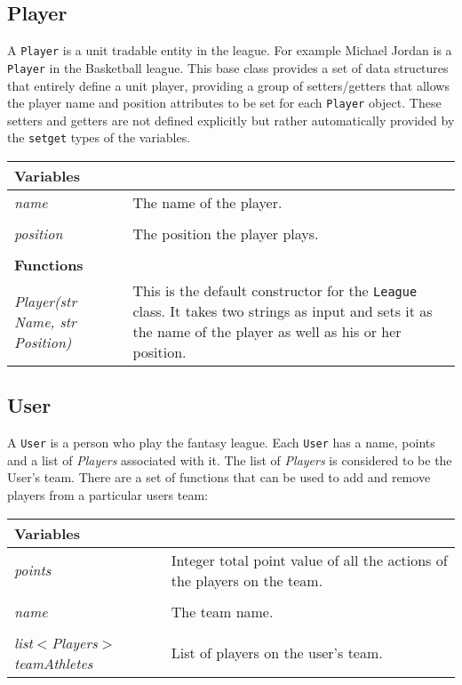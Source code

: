 \documentclass[12pt]{report}
\begin{document}
\subsection{Player}

A \texttt{Player} is a unit tradable entity in the league. For example Michael Jordan is a \texttt{Player} in the Basketball league. This base class provides a set of data structures that entirely define a unit player, providing a group of setters/getters that allows the player name and position attributes to be set for each \texttt{Player} object. These setters and getters are not defined explicitly but rather automatically provided by the \texttt{setget} types of the variables.

\begin{flushleft}
\begin{singlespace}
\begin{tabular}{ l | p{10cm} }
\hline
\textbf{Variables} & \\
\hline
\textit{name} & The name of the player. \\
\\
\textit{position} & The position the player plays. \\
\\
\hline
\textbf{Functions} & \\
\hline
\textit{Player(str Name, str Position)} & This is the default constructor for the \texttt{League} class. It takes two strings as input and sets it as the name of the player as well as his or her position. \\
\hline
\end{tabular}
\end{singlespace}
\end{flushleft}

\subsection{User}

A \texttt{User} is a person who play the fantasy league. Each \texttt{User} has a name, points and a list of \textit{Players} associated with it. The list of \textit{Players} is considered to be the User's team. There are a set of functions that can be used to add and remove players from a particular users team:

\begin{flushleft}
\begin{singlespace}
\begin{tabular}{ p{5.5cm} | p{10cm} }
\hline
\textbf{Variables} & \\
\hline
\textit{points} & Integer total point value of all the actions of the players on the team. \\
\\
\textit{name} & The team name. \\
\\
\textit{list$<$Players$>$ teamAthletes} & List of players on the user's team. \\
\end{tabular}
\end{singlespace}
\end{flushleft}
\end{document}
